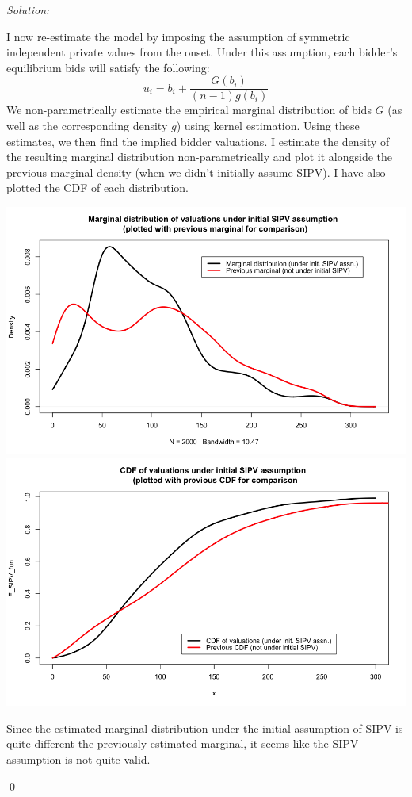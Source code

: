 \documentclass[12pt]{article}
\newenvironment{sol}
    {\emph{Solution:}
    }
    {
    \qed
    }
\begin{document}
\begin{sol}
    I now re-estimate the model by imposing the assumption of symmetric independent private values from the onset. Under this assumption, each bidder's equilibrium bids will satisfy the following:
    \[u_i = b_i + \frac{G(b_i)}{(n-1)g(b_i)}\]
    We non-parametrically estimate the empirical marginal distribution of bids $G$ (as well as the corresponding density $g$) using kernel estimation. Using these estimates, we then find the implied bidder valuations. I estimate the density of the resulting marginal distribution non-parametrically and plot it alongside the previous marginal density (when we didn't initially assume SIPV). I have also plotted the CDF of each distribution.
    \begin{center}
        \includegraphics[scale=0.45]{Marginal SIPV.png}\\
        \includegraphics[scale=0.45]{SIPV_CDF.png}
    \end{center}
    Since the estimated marginal distribution under the initial assumption of SIPV is quite different the previously-estimated marginal, it seems like the SIPV assumption is not quite valid.
\end{sol}
\end{document}
